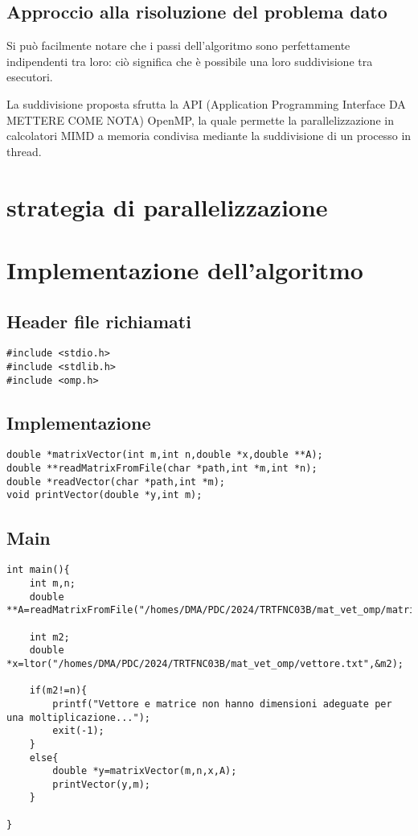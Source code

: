 \documentclass{article}
\begin{document}
\subsection{Approccio alla risoluzione del problema dato}
Si può facilmente notare che i passi dell'algoritmo sono perfettamente indipendenti tra loro: ciò significa che è possibile una loro suddivisione tra esecutori.

La suddivisione proposta sfrutta la API (Application Programming Interface DA METTERE COME NOTA) OpenMP, la quale permette la parallelizzazione in calcolatori MIMD a memoria condivisa mediante la suddivisione di un processo in thread.

\section{strategia di parallelizzazione}


\clearpage
\section{Implementazione dell'algoritmo}

\subsection{Header file richiamati}
\begin{lstlisting}
#include <stdio.h>
#include <stdlib.h>
#include <omp.h>
\end{lstlisting}

\subsection{Implementazione}
\begin{lstlisting}
double *matrixVector(int m,int n,double *x,double **A);
double **readMatrixFromFile(char *path,int *m,int *n);
double *readVector(char *path,int *m);
void printVector(double *y,int m);
\end{lstlisting}

\subsection{Main}
\begin{lstlisting}
int main(){
    int m,n;
    double **A=readMatrixFromFile("/homes/DMA/PDC/2024/TRTFNC03B/mat_vet_omp/matrice.txt",&m,&n);

    int m2;
    double *x=ltor("/homes/DMA/PDC/2024/TRTFNC03B/mat_vet_omp/vettore.txt",&m2);

    if(m2!=n){
        printf("Vettore e matrice non hanno dimensioni adeguate per una moltiplicazione...");
        exit(-1);
    }
    else{
        double *y=matrixVector(m,n,x,A);
        printVector(y,m);
    }

}
\end{lstlisting}
\end{document}
